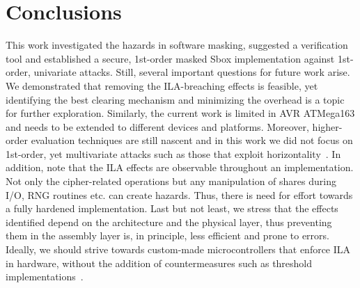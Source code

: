 \section{Conclusions} \label{sec:conclusions}

This work investigated the hazards in software masking, suggested a verification tool and established a secure, 1st-order masked Sbox implementation against 1st-order, univariate attacks. Still, several important questions for future work arise. We demonstrated that removing the ILA-breaching effects is feasible, yet identifying the best clearing mechanism and minimizing the overhead is a topic for further exploration. Similarly, the current work is limited in AVR ATMega163 and needs to be extended to different devices and platforms. Moreover, higher-order evaluation techniques are still nascent and in this work we did not focus on 1st-order, yet multivariate attacks such as those that exploit horizontality~\cite{DBLP:conf/ches/BattistelloCPZ16}. In addition, note that the ILA effects are observable throughout an implementation. Not only the cipher-related operations but any manipulation of shares during I/O, RNG routines etc. can create hazards. Thus, there is need for effort towards a fully hardened implementation. Last but not least, we stress that the effects identified depend on the architecture and the physical layer, thus preventing them in the assembly layer is, in principle, less efficient and prone to errors. Ideally, we should strive towards custom-made microcontrollers that enforce ILA in hardware, without the addition of countermeasures such as threshold implementations~\cite{DBLP:conf/icics/NikovaRR06}.  
